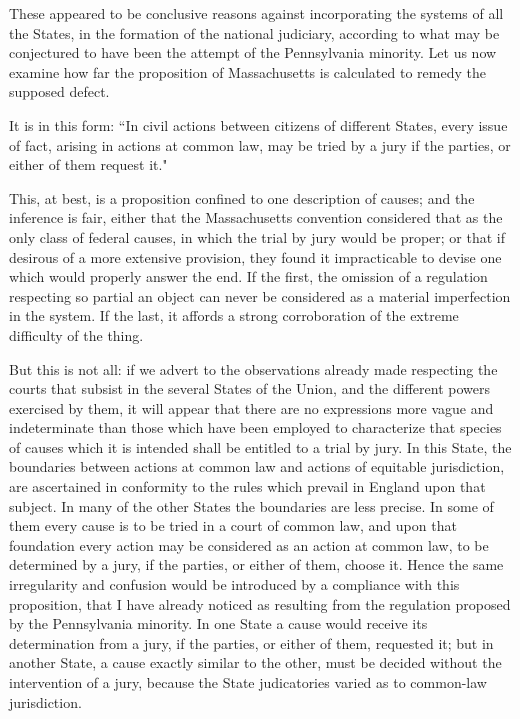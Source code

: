 These appeared to be conclusive reasons against incorporating the systems of all the States, in the formation of the national judiciary, according to what may be conjectured to have been the attempt of the Pennsylvania minority. 
Let us now examine how far the proposition of Massachusetts is calculated to remedy the supposed defect.

It is in this form: ``In civil actions between citizens of different States, every issue of fact, arising in actions at common law, may be tried by a jury if the parties, or either of them request it."

This, at best, is a proposition confined to one description of causes; and the inference is fair, either that the Massachusetts convention considered that as the only class of federal causes, in which the trial by jury would be proper; or that if desirous of a more extensive provision, they found it impracticable to devise one which would properly answer the end. 
If the first, the omission of a regulation respecting so partial an object can never be considered as a material imperfection in the system. 
If the last, it affords a strong corroboration of the extreme difficulty of the thing.

But this is not all: if we advert to the observations already made respecting the courts that subsist in the several States of the Union, and the different powers exercised by them, it will appear that there are no expressions more vague and indeterminate than those which have been employed to characterize that species of causes which it is intended shall be entitled to a trial by jury. 
In this State, the boundaries between actions at common law and actions of equitable jurisdiction, are ascertained in conformity to the rules which prevail in England upon that subject. 
In many of the other States the boundaries are less precise. 
In some of them every cause is to be tried in a court of common law, and upon that foundation every action may be considered as an action at common law, to be determined by a jury, if the parties, or either of them, choose it. 
Hence the same irregularity and confusion would be introduced by a compliance with this proposition, that I have already noticed as resulting from the regulation proposed by the Pennsylvania minority. 
In one State a cause would receive its determination from a jury, if the parties, or either of them, requested it; but in another State, a cause exactly similar to the other, must be decided without the intervention of a jury, because the State judicatories varied as to common-law jurisdiction.

